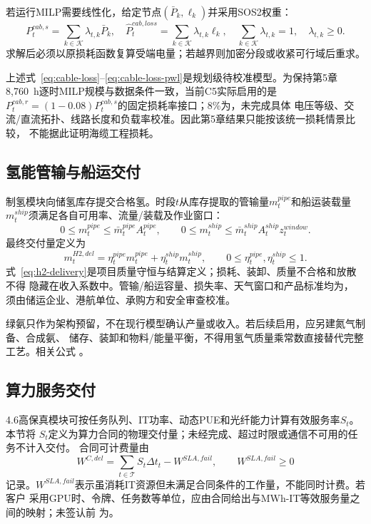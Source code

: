 若运行MILP需要线性化，给定节点$(\bar P_k,\ell_k)$并采用SOS2权重：
\begin{equation}
P_t^{cab,s}=\sum_{k\in\mathcal K}\lambda_{t,k}\bar P_k,
\quad
\widehat P_t^{cab,loss}=\sum_{k\in\mathcal K}\lambda_{t,k}\ell_k,
\quad
\sum_{k\in\mathcal K}\lambda_{t,k}=1,
\quad \lambda_{t,k}\ge0.
\label{eq:cable-loss-pwl}
\end{equation}
求解后必须以原损耗函数复算受端电量；若越界则加密分段或收紧可行域后重求。

上述式~\eqref{eq:cable-loss}--\eqref{eq:cable-loss-pwl}是规划级待校准模型。为保持第5章
8,760~h逐时MILP规模与数据条件一致，当前C5实际启用的是
$P_t^{cab,r}=(1-0.08)P_t^{cab,s}$的固定损耗率接口；8\%为\assumptiontag，未完成具体
电压等级、交流/直流拓扑、线路长度和负载率校准。因此第5章结果只能按该统一损耗情景比较，
不能据此证明海缆工程损耗。

\subsection{氢能管输与船运交付}

制氢模块向储氢库存提交合格氢。时段$t$从库存提取的管输量$m_t^{pipe}$和船运装载量
$m_t^{ship}$须满足各自可用率、流量/装载及作业窗口：
\begin{equation}
0\le m_t^{pipe}\le \bar m_t^{pipe}A_t^{pipe},
\qquad
0\le m_t^{ship}\le \bar m_t^{ship}A_t^{ship}z_t^{window}.
\label{eq:h2-channel-capacity}
\end{equation}
最终交付量定义为
\begin{equation}
m_t^{H2,del}
=\eta_t^{pipe}m_t^{pipe}+\eta_t^{ship}m_t^{ship},
\qquad 0\le\eta_t^{pipe},\eta_t^{ship}\le1.
\label{eq:h2-delivery}
\end{equation}
式~\eqref{eq:h2-delivery}是项目质量守恒与结算定义；损耗、装卸、质量不合格和放散不得
隐藏在收入系数中。管输/船运容量、损失率、天气窗口和产品标准均为\assumptiontag，
须由储运企业、港航单位、承购方和安全审查校准。

绿氨只作为架构预留，不在现行模型确认产量或收入。若后续启用，应另建氮气制备、合成氨、
储存、装卸和物料/能量平衡，不得用氢气质量乘常数直接替代完整工艺。相关公式
\verifytag。

\subsection{算力服务交付}

4.6高保真模块可按任务队列、IT功率、动态PUE和光纤能力计算有效服务率$S_t$。本节将
$S_t$定义为算力合同的物理交付量；未经完成、超过时限或通信不可用的任务不计入交付。
合同可计费量由
\begin{equation}
W^{C,del}=\sum_{t\in\mathcal T} S_t\Delta t_t-W^{SLA,fail},
\qquad W^{SLA,fail}\ge0
\label{eq:compute-delivery}
\end{equation}
记录。$W^{SLA,fail}$表示虽消耗IT资源但未满足合同条件的工作量，不能同时计费。若客户
采用GPU时、令牌、任务数等单位，应由合同给出与MWh-IT等效服务量之间的映射；未签认前
为\assumptiontag。

